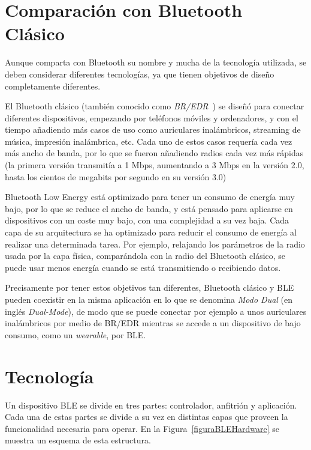 \section{Comparación con Bluetooth Clásico}
\label{makereference2.1}

Aunque comparta con Bluetooth su nombre y mucha de la tecnología utilizada, se deben considerar diferentes tecnologías, ya que tienen objetivos de diseño completamente diferentes.

El Bluetooth clásico (también conocido como \textit{BR/EDR}~\cite{bluetoothCS}) se diseñó para conectar diferentes dispositivos, empezando por teléfonos móviles y ordenadores, y con el tiempo añadiendo más casos de uso como auriculares inalámbricos, streaming de música, impresión inalámbrica, etc. Cada uno de estos casos requería cada vez más ancho de banda, por lo que se fueron añadiendo radios cada vez más rápidas (la primera versión transmitía a 1 Mbps, aumentando a 3 Mbps en la versión 2.0, hasta los cientos de megabits por segundo en su versión 3.0)

Bluetooth Low Energy está optimizado para tener un consumo de energía muy bajo, por lo que se reduce el ancho de banda, y está pensado para aplicarse en dispositivos con un coste muy bajo, con una complejidad a su vez baja. Cada capa de su arquitectura se ha optimizado para reducir el consumo de energía al realizar una determinada tarea. Por ejemplo, relajando los parámetros de la radio usada por la capa física, comparándola con la radio del Bluetooth clásico, se puede usar menos energía cuando se está transmitiendo o recibiendo datos.

Precisamente por tener estos objetivos tan diferentes, Bluetooth clásico y BLE pueden coexistir en la misma aplicación en lo que se denomina \textit{Modo Dual} (en inglés \textit{Dual-Mode}), de modo que se puede conectar por ejemplo a unos auriculares inalámbricos por medio de BR/EDR mientras se accede a un dispositivo de bajo consumo, como un \textit{wearable}, por BLE.

\section{Tecnología}
\label{makereference2.2}

Un dispositivo BLE se divide en tres partes: controlador, anfitrión y aplicación. Cada una de estas partes se divide a su vez en distintas capas que proveen la funcionalidad necesaria para operar. En la Figura~\ref{figuraBLEHardware} se muestra un esquema de esta estructura.

